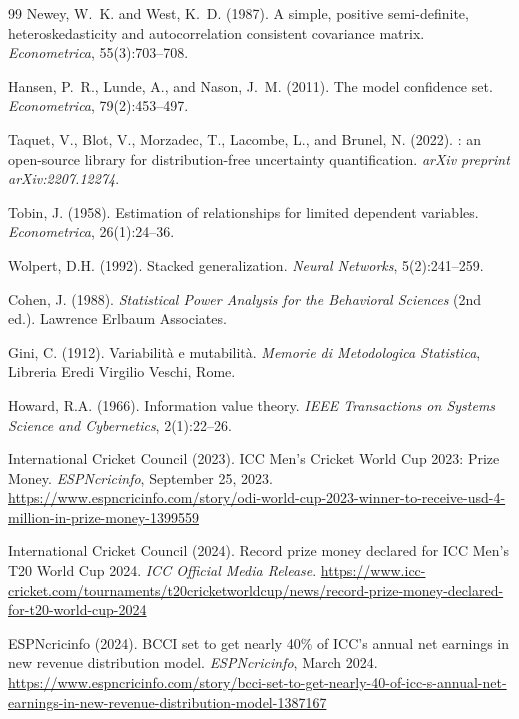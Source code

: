 \documentclass[12pt,a4paper,oneside]{report}
\begin{document}
\begin{thebibliography}{99}
Newey, W.~K. and West, K.~D. (1987).
\newblock A simple, positive semi-definite, heteroskedasticity and autocorrelation consistent covariance matrix.
\newblock \emph{Econometrica}, 55(3):703--708.

Hansen, P.~R., Lunde, A., and Nason, J.~M. (2011).
\newblock The model confidence set.
\newblock \emph{Econometrica}, 79(2):453--497.

Taquet, V., Blot, V., Morzadec, T., Lacombe, L., and Brunel, N. (2022).
: an open-source library for distribution-free uncertainty quantification.
\newblock \emph{arXiv preprint arXiv:2207.12274}.

Tobin, J. (1958).
\newblock Estimation of relationships for limited dependent variables.
\newblock \emph{Econometrica}, 26(1):24--36.

Wolpert, D.H. (1992).
\newblock Stacked generalization.
\newblock \emph{Neural Networks}, 5(2):241--259.

Cohen, J. (1988).
\newblock \emph{Statistical Power Analysis for the Behavioral Sciences} (2nd ed.).
\newblock Lawrence Erlbaum Associates.

Gini, C. (1912).
\newblock Variabilit\`a e mutabilit\`a.
\newblock \emph{Memorie di Metodologica Statistica}, Libreria Eredi Virgilio Veschi, Rome.

Howard, R.A. (1966).
\newblock Information value theory.
\newblock \emph{IEEE Transactions on Systems Science and Cybernetics}, 2(1):22--26.

International Cricket Council (2023).
\newblock ICC Men's Cricket World Cup 2023: Prize Money.
\newblock \emph{ESPNcricinfo}, September 25, 2023.
\newblock \url{https://www.espncricinfo.com/story/odi-world-cup-2023-winner-to-receive-usd-4-million-in-prize-money-1399559}

International Cricket Council (2024).
\newblock Record prize money declared for ICC Men's T20 World Cup 2024.
\newblock \emph{ICC Official Media Release}.
\newblock \url{https://www.icc-cricket.com/tournaments/t20cricketworldcup/news/record-prize-money-declared-for-t20-world-cup-2024}

ESPNcricinfo (2024).
\newblock BCCI set to get nearly 40\% of ICC's annual net earnings in new revenue distribution model.
\newblock \emph{ESPNcricinfo}, March 2024.
\newblock \url{https://www.espncricinfo.com/story/bcci-set-to-get-nearly-40-of-icc-s-annual-net-earnings-in-new-revenue-distribution-model-1387167}


\end{thebibliography}
\end{document}
